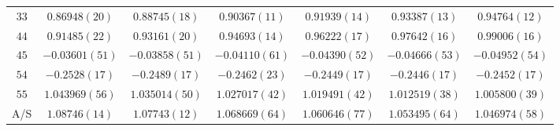 \begin{table}
\begin{center}
\begin{tabular}{c|c c c c c c}
$33$ & $0.86948(20)$ & $0.88745(18)$ & $0.90367(11)$ & $0.91939(14)$ & $0.93387(13)$ & $0.94764(12)$ \\
$44$ & $0.91485(22)$ & $0.93161(20)$ & $0.94693(14)$ & $0.96222(17)$ & $0.97642(16)$ & $0.99006(16)$ \\
$45$ & $-0.03601(51)$ & $-0.03858(51)$ & $-0.04110(61)$ & $-0.04390(52)$ & $-0.04666(53)$ & $-0.04952(54)$ \\
$54$ & $-0.2528(17)$ & $-0.2489(17)$ & $-0.2462(23)$ & $-0.2449(17)$ & $-0.2446(17)$ & $-0.2452(17)$ \\
$55$ & $1.043969(56)$ & $1.035014(50)$ & $1.027017(42)$ & $1.019491(42)$ & $1.012519(38)$ & $1.005800(39)$ \\
\hline
A/S & $1.08746(14)$ & $1.07743(12)$ & $1.068669(64)$ & $1.060646(77)$ & $1.053495(64)$ & $1.046974(58)$ \\
\hline
\hline
\end{tabular}
\end{center}
\end{table}